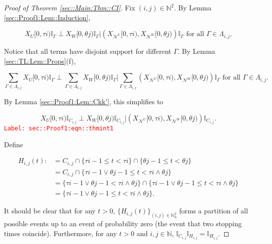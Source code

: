 \documentclass[12pt]{article}
\newcommand{\mb}{\mathbb}
\newcommand{\mc}{\mathcal}
\newcommand{\te}{\text}
\newcommand{\tr}{\textcolor{red}}
\newcommand{\labe}[1]{\tr{\texttt{Label: #1}}}
\renewcommand{\U}{U}							%
\newcommand{\UU}{W}								%
\renewcommand{\t}{t}							%
\newcommand{\X}{X}								%
\newcommand{\neigh}{\mc{N}}						%
\newcommand{\vind}[1]{^{#1}}					%
\newcommand{\cind}[1]{_{#1}}					%
\newcommand{\tip}[1]{#1}						%
\newcommand{\rt}{\tau}							%
\newcommand{\rtt}{\theta}						%
\newcommand{\apath}{\Gamma}						%
\newcommand{\pathset}[2]{\Lambda_{#1,#2}}		%
\newcommand{\pathsete}[2]{C_{#1,#2}}			%
\newcommand{\pathseted}[2]{H_{#1,#2}}			%
\begin{document}
\begin{proof}[Proof of Theorem \ref{sec::Main:Thm::CI}]

Fix \((i,j) \in \mb{N}^2\). By Lemma \ref{sec::Proof1:Lem::Induction}, 

\[\X\cind{\U}\tip{[0,\rt{i})}\mb{I}_{\apath{}}\perp \X\cind{\UU}\tip{[0,\rtt{j})}\mb{I}_{\apath{}}\big|\left(\X\cind{\neigh\vind{\U}}\tip{[0,\rt{i})},\X\cind{\neigh\vind{\UU}}\tip{[0,\rtt{j})}\right)\mb{I}_{\apath{}}\te{ for all }\apath{} \in \pathset{i}{j}.\]

Notice that all terms have disjoint support for different \(\apath{}\). By Lemma \ref{sec::TL:Lem::Props}(f), 

\[\sum_{\apath{}\in\pathset{i}{j}}\X\cind{\U}\tip{[0,\rt{i})}\mb{I}_{\apath{}}\perp \sum_{\apath{}\in\pathset{i}{j}}\X\cind{\UU}\tip{[0,\rtt{j})}\mb{I}_{\apath{}}\bigg|\sum_{\apath{}\in\pathset{i}{j}}\left(\X\cind{\neigh\vind{\U}}\tip{[0,\rt{i})},\X\cind{\neigh\vind{\UU}}\tip{[0,\rtt{j})}\right)\mb{I}_{\apath{}}\te{ for all }\apath{} \in \pathset{i}{j}.\]

By Lemma \ref{sec::Proof1:Lem::Ckk'}, this simplifies to 

\begin{equation}
\X\cind{\U}\tip{[0,\rt{i})}\mb{I}_{\pathsete{i}{j}}\perp \X\cind{\UU}\tip{[0,\rtt{j})}\mb{I}_{\pathsete{i}{j}}\big|\left(\X\cind{\neigh\vind{\U}}\tip{[0,\rt{i})},\X\cind{\neigh\vind{\UU}}\tip{[0,\rtt{j})}\right)\mb{I}_{\pathsete{i}{j}}.
\label{sec::Proof1:eqn::thmint1}
\end{equation}
\labe{sec::Proof1:eqn::thmint1}

Define

\begin{align*}
\pathseted{i}{j}(\t) :&= \pathsete{i}{j}\cap \{\rt{i-1}\leq \t < \rt{i}\}\cap \{\rtt{j-1} \leq \t < \rtt{j}\}\\
&=\pathsete{i}{j}\cap\{\rt{i-1}\vee\rtt{j-1} \leq \t < \rt{i}\wedge \rtt{j}\}\\
&=\{\rt{i-1}\vee\rtt{j-1}  < \rt{i}\wedge \rtt{j}\} \cap \{\rt{i-1}\vee\rtt{j-1} \leq \t < \rt{i}\wedge \rtt{j}\}\\
&= \{\rt{i-1}\vee\rtt{j-1} \leq \t < \rt{i}\wedge \rtt{j}\}.
\end{align*}

It should be clear that for any \(\t > 0\), \(\{\pathseted{i}{j}(\t)\}_{(i,j)\in\mb{N}_0^2}\) forms a partition of all possible events up to an event of probability zero (the event that two stopping times coincide). Furthermore, for any \(\t > 0\) and \(i,j\in \mb{N}\), \(\mb{I}_{\pathsete{i}{j}}\mb{I}_{\pathseted{i}{j}} = \mb{I}_{\pathseted{i}{j}}\).


\end{proof}
\end{document}
